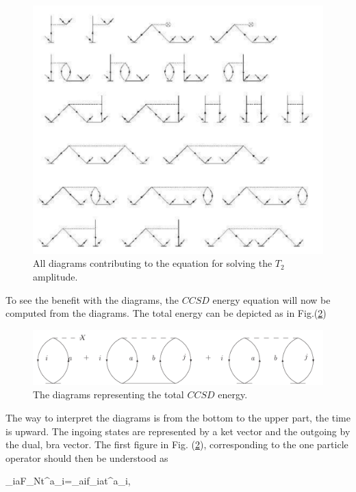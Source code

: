 \begin{figure}[htp]
\centering
\includegraphics[scale=0.5]{CCSD_diag}%
\caption{All diagrams contributing to the equation for solving the
$T_2$ amplitude.}
\label{t2_eqn_diag}
\end{figure}


To see the benefit with the diagrams, the $CCSD$ energy 
equation will now be computed from the diagrams. The total 
energy can be depicted as in Fig.(\ref{totenergydi})


\begin{figure}[htp]
\centering
\includegraphics[width=1.0\textwidth]{energy}
\caption{The diagrams representing the total $CCSD$ 
energy.}
\label{totenergydi}
\end{figure}

The way to interpret the diagrams is from the bottom to the 
upper part, the time is upward. The ingoing states are 
represented by a ket vector and the outgoing by the dual, bra 
vector. The first figure in Fig. (\ref{totenergydi}), 
corresponding to the one particle operator should then be 
understood as

\be
\sum_{ia}F_Nt^a_i=\sum_{ai}f_{ia}t^a_i,
\ee

